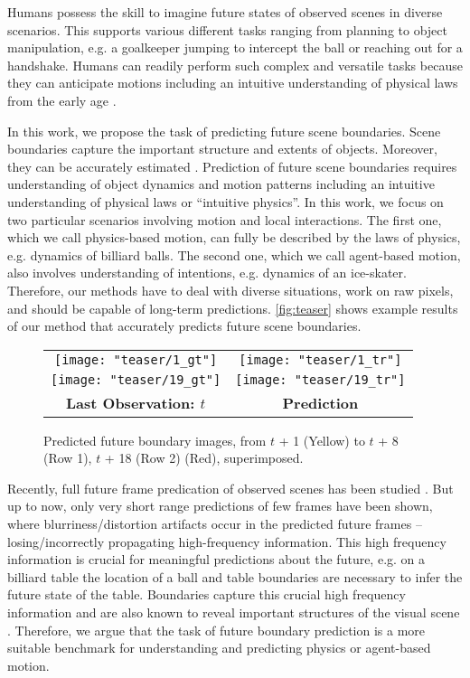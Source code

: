 Humans possess the skill to imagine future states of observed scenes in  diverse scenarios. This supports various different tasks ranging from planning to object manipulation, e.g. a goalkeeper jumping to intercept the ball or reaching out for a handshake. Humans can readily perform such complex and versatile tasks because they can anticipate motions including an intuitive understanding of physical laws from the early age \cite{baillargeon1994infants,baillargeon2004infants}. 

In this work, we propose the task of predicting future scene boundaries. Scene boundaries capture the important structure and extents of objects. Moreover, they can be accurately estimated \cite{khoreva2016improved}. Prediction of future scene boundaries requires understanding of object dynamics and motion patterns including an intuitive understanding of physical laws or ``intuitive physics''. In this work, we focus on two particular scenarios involving motion and local interactions. The first one, which we call physics-based motion, can fully be described by the laws of physics, e.g. dynamics of  billiard balls. The second one, which we call agent-based motion, also involves understanding of intentions, e.g. dynamics of an ice-skater. Therefore, our methods have to deal with diverse situations, work on raw pixels, and should be capable of long-term predictions. \autoref{fig:teaser} shows example results of our method that accurately predicts future scene boundaries.

\begin{figure}[t]
\centering
\begin{tabular}{cc }
\texttt{[image: "teaser/1\_gt"]} &
\texttt{[image: "teaser/1\_tr"]}\\
\texttt{[image: "teaser/19\_gt"]} &
\texttt{[image: "teaser/19\_tr"]}\\
\textbf{Last Observation: $t$} & \textbf{Prediction} \\
\end{tabular}
\caption{Predicted future boundary images, from $t$ + 1 (Yellow) to $t$ + 8 (Row 1), $t$ + 18 (Row 2) (Red), superimposed.}\label{fig:teaser}
\end{figure}

Recently, full future frame predication of observed scenes has been studied \cite{mathieu2015deep,liu2017video}. But up to now, only very short range predictions of few frames have been shown, where blurriness/distortion artifacts occur in the predicted future frames -- losing/incorrectly propagating high-frequency information. This high frequency information is crucial for meaningful predictions about the future, e.g. on a billiard table the location of a ball and table boundaries are necessary to infer the future state of the table. Boundaries capture this crucial high frequency information and are also known to reveal important structures of the visual scene \cite{wertheimer1923laws,amfm_pami2011,galasso2013unified}. Therefore, we argue that the task of future boundary prediction is a more suitable benchmark for understanding and predicting physics or agent-based motion.


